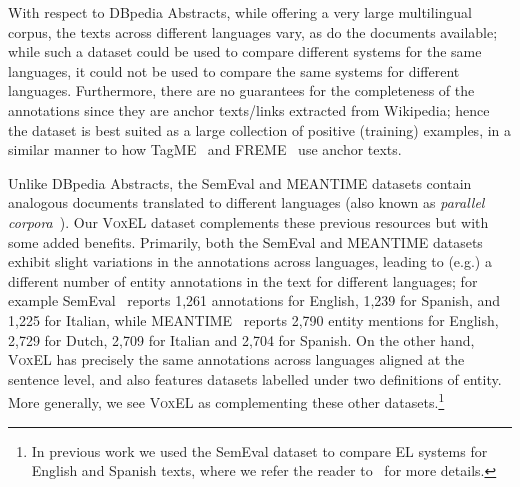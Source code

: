 \documentclass{llncs}
\begin{document}

With respect to DBpedia Abstracts, while offering a very large multilingual corpus, the texts across different languages vary, as do the documents available; while such a dataset could be used to compare different systems for the same languages, it could not be used to compare the same systems for different languages. Furthermore, there are no guarantees for the completeness of the annotations since they are anchor texts/links extracted from Wikipedia; hence the dataset is best suited as a large collection of positive (training) examples, in a similar manner to how TagME~\cite{ferragina2010tagme} and FREME~\cite{freme-ner2016} use anchor texts.

Unlike DBpedia Abstracts, the SemEval and MEANTIME datasets contain analogous documents translated to different languages (also known as \textit{parallel corpora}~\cite{moro2015semeval}). Our \textsc{VoxEL} dataset complements these previous resources but with some added benefits. Primarily, both the SemEval and MEANTIME datasets exhibit slight variations in the annotations across languages, leading to (e.g.) a different number of entity annotations in the text for different languages; for example SemEval~\cite{moro2015semeval} reports 1,261 annotations for English, 1,239 for Spanish, and 1,225 for Italian, while MEANTIME~\cite{meantime2016} reports 2,790 entity mentions for English, 2,729 for Dutch, 2,709 for Italian and 2,704 for Spanish. On the other hand, \textsc{VoxEL} has precisely the same annotations across languages aligned at the sentence level, and also features datasets labelled under two definitions of entity. More generally, we see \textsc{VoxEL} as complementing these other datasets.\footnote{In previous work we used the SemEval dataset to compare EL systems for English and Spanish texts, where we refer the reader to~\cite{Rosales-MendezP17} for more details.}


\end{document}
